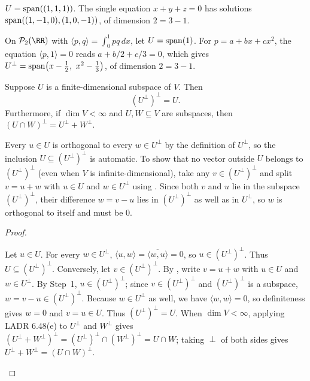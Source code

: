 \documentclass[10pt]{scrartcl}
\newcommand{\ip}[2]{\langle #1,#2\rangle}
\begin{document}
\begin{example*}[$U^\perp$ in $\RR^3$]
  $U=\operatorname{span}((1,1,1))$. The single equation $x+y+z=0$ has solutions $\operatorname{span}((1,-1,0),(1,0,-1))$, of dimension $2=3-1$.
\end{example*}

\begin{example*}
  On $\PP_2(\RR)$ with $\ip pq=\int_0^1pq\,dx$, let $U=\operatorname{span}(1)$. For $p=a+bx+cx^2$, the equation $\ip p1=0$ reads $a+b/2+c/3=0$, which gives $U^\perp=\spn\bigl(x-\frac12,\ x^2-\frac13\bigr)$, of dimension $2=3-1$.
\end{example*}

\begin{proposition*}[Prop.~90 / LADR 6.52: Double orthogonal complement $(U^\perp)^\perp=U$]
  Suppose $U$ is a finite-dimensional subspace of $V$. Then
  \[
    (U^\perp)^\perp = U.
  \]
  Furthermore, if $\dim V<\infty$ and $U,W\subseteq V$ are subspaces, then $(U\cap W)^\perp = U^\perp + W^\perp$.
\end{proposition*}
\begin{ideabox}
  Every $u\in U$ is orthogonal to every $w\in U^\perp$ by the definition of $U^\perp$, so the inclusion $U\subseteq(U^\perp)^\perp$ is automatic. To show that no vector outside $U$ belongs to $(U^\perp)^\perp$ (even when $V$ is infinite-dimensional), take any $v\in(U^\perp)^\perp$ and split $v=u+w$ with $u\in U$ and $w\in U^\perp$ using . Since both $v$ and $u$ lie in the subspace $(U^\perp)^\perp$, their difference $w=v-u$ lies in $(U^\perp)^\perp$ as well as in $U^\perp$, so $w$ is orthogonal to itself and must be $0$.
\end{ideabox}
\begin{proof}
  \begin{steps}
    \ii Let $u\in U$. For every $w\in U^\perp$, $\ip uw=\overline{\ip wu}=0$, so $u\in(U^\perp)^\perp$. Thus $U\subseteq(U^\perp)^\perp$.
    \ii Conversely, let $v\in(U^\perp)^\perp$. By , write $v=u+w$ with $u\in U$ and $w\in U^\perp$.
    \ii By Step~1, $u\in(U^\perp)^\perp$; since $v\in(U^\perp)^\perp$ and $(U^\perp)^\perp$ is a subspace, $w=v-u\in(U^\perp)^\perp$. Because $w\in U^\perp$ as well, we have $\ip ww=0$, so definiteness gives $w=0$ and $v=u\in U$. Thus $(U^\perp)^\perp=U$.
    \ii When $\dim V<\infty$, applying LADR 6.48(e) to $U^\perp$ and $W^\perp$ gives $(U^\perp+W^\perp)^\perp=(U^\perp)^\perp\cap(W^\perp)^\perp=U\cap W$; taking $\perp$ of both sides gives $U^\perp+W^\perp=(U\cap W)^\perp$.
  \end{steps}
\end{proof}
\end{document}
